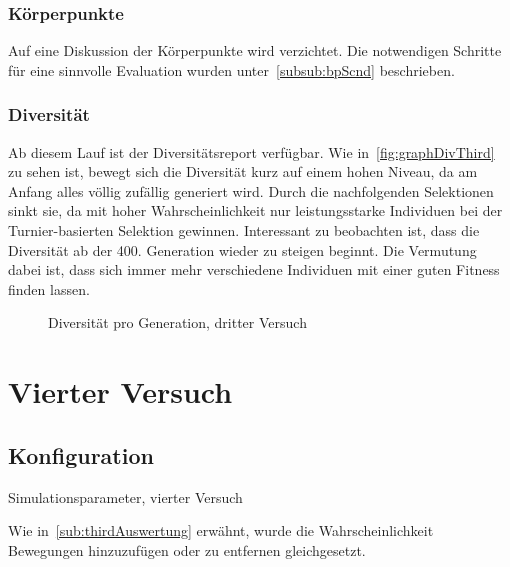       \subsubsection{Körperpunkte}

        Auf eine Diskussion der Körperpunkte wird verzichtet.
        Die notwendigen Schritte für eine sinnvolle Evaluation wurden unter~\vref{subsub:bpScnd} beschrieben.

      \subsubsection{Diversität}

        Ab diesem Lauf ist der Diversitätsreport verfügbar.
        Wie in~\vref{fig:graphDivThird} zu sehen ist, bewegt sich die Diversität kurz auf einem hohen Niveau,
        da am Anfang alles völlig zufällig generiert wird.
        Durch die nachfolgenden Selektionen sinkt sie, da mit hoher Wahrscheinlichkeit nur leistungsstarke Individuen
        bei der Turnier-basierten Selektion gewinnen.
        Interessant zu beobachten ist, dass die Diversität ab der 400. Generation wieder zu steigen beginnt.
        Die Vermutung dabei ist, dass sich immer mehr verschiedene Individuen mit einer guten Fitness finden lassen.

        \begin{figure}
          \centering
          
          \caption{Diversität pro Generation, dritter Versuch\label{fig:graphDivThird}}
        \end{figure}

  \section{Vierter Versuch}

    \subsection{Konfiguration}

      \begin{table}[H]
        \centering
        
        \caption{Simulationsparameter, vierter Versuch\label{tbl:forthRunConf}}
      \end{table}

      Wie in~\vref{sub:thirdAuswertung} erwähnt,
      wurde die Wahrscheinlichkeit Bewegungen hinzuzufügen oder zu entfernen gleichgesetzt.

